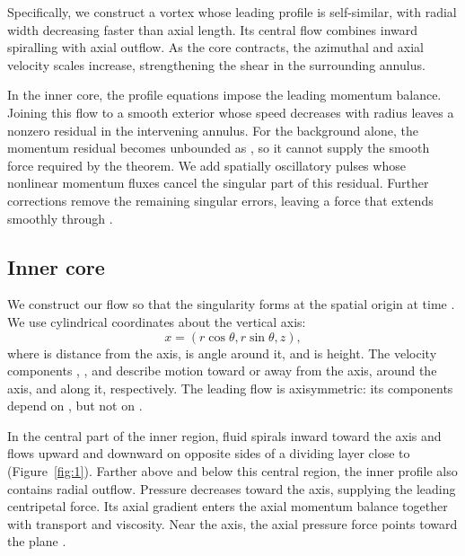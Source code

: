 Specifically, we construct a vortex whose leading profile is self-similar, with radial width
decreasing faster than axial length. Its central flow combines inward spiralling with axial
outflow. As the core contracts, the azimuthal and axial velocity scales increase, strengthening
the shear in the surrounding annulus.

In the inner core, the profile equations impose the leading momentum balance. Joining
this flow to a smooth exterior whose speed decreases with radius leaves a nonzero residual
in the intervening annulus. For the background alone, the momentum residual becomes
unbounded as , so it cannot supply the smooth force required by the theorem. We add
spatially oscillatory pulses whose nonlinear momentum fluxes cancel the singular part of
this residual. Further corrections remove the remaining singular errors, leaving a force that
extends smoothly through .

\subsection{Inner core}\label{sec:2.1}
We construct our flow so that the singularity forms at the spatial origin at
time . We use cylindrical coordinates about the vertical axis:
\begin{equation*}
  x=(r\cos\theta,r\sin\theta,z),
\end{equation*}
where  is distance from the axis,  is angle around it, and  is height. The velocity
components , , and  describe motion toward or away from the axis, around the axis,
and along it, respectively. The leading flow  is axisymmetric: its components depend on
, but not on .

In the central part of the inner region, fluid spirals inward toward the axis and flows
upward and downward on opposite sides of a dividing layer close to  (Figure~\ref{fig:1}).
Farther above and below this central region, the inner profile also contains radial outflow.
Pressure decreases toward the axis, supplying the leading centripetal force. Its axial gradient
enters the axial momentum balance together with transport and viscosity. Near the axis, the
axial pressure force points toward the plane .

